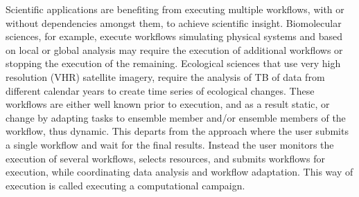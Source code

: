 Scientific applications are benefiting from executing multiple workflows, with or without dependencies amongst them, to achieve scientific insight.
Biomolecular sciences, for example, execute workflows simulating physical systems and based on local or global analysis may require the execution of additional workflows or stopping the execution of the remaining.
Ecological sciences that use very high resolution (VHR) satellite imagery, require the analysis of TB of data from different calendar years to create time series of ecological changes.
These workflows are either well known prior to execution, and as a result static, or change by adapting tasks to ensemble member and/or ensemble members of the workflow, thus dynamic.
This departs from the approach where the user submits a single workflow and wait for the final results.
Instead the user monitors the execution of several workflows, selects resources, and submits workflows for execution, while coordinating data analysis and workflow adaptation.
This way of execution is called executing a computational campaign.

